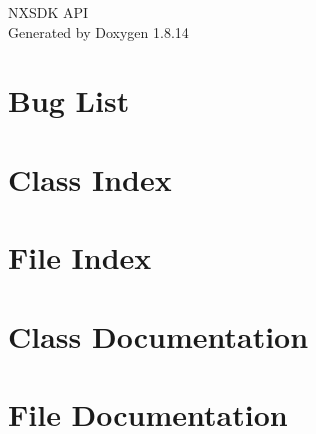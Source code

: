 \documentclass[twoside]{book}
\newcommand{\+}{\discretionary{\mbox{\scriptsize$\hookleftarrow$}}{}{}}
\newcommand{\clearemptydoublepage}{%
  \newpage{\pagestyle{empty}\cleardoublepage}%
}
\begin{document}
\hypersetup{pageanchor=false,
             bookmarksnumbered=true,
             pdfencoding=unicode
            }
\begin{titlepage}
\vspace*{7cm}
\begin{center}%
{\Large N\+X\+S\+DK A\+PI }\\
\vspace*{1cm}
{\large Generated by Doxygen 1.8.14}\\
\end{center}
\end{titlepage}
\clearemptydoublepage
{}
\tableofcontents
\clearemptydoublepage
{}
\hypersetup{pageanchor=true}

\chapter{Bug List}
\label{bug}

\chapter{Class Index}

\chapter{File Index}

\chapter{Class Documentation}



























\chapter{File Documentation}










\backmatter
\newpage
{}
\clearemptydoublepage
{}
\printindex
\end{document}
